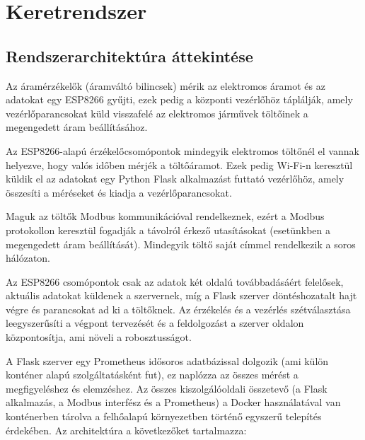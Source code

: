 \chapter{Keretrendszer}

\section{Rendszerarchitektúra áttekintése}

Az áramérzékelők (áramváltó bilincsek) mérik az elektromos áramot és az 
adatokat egy ESP8266 gyűjti, ezek pedig a központi vezérlőhöz táplálják, 
amely vezérlőparancsokat küld visszafelé az elektromos járművek töltőinek 
a megengedett áram beállításához.

Az ESP8266-alapú érzékelőcsomópontok mindegyik elektromos töltőnél el vannak helyezve, 
hogy valós időben mérjék a töltőáramot.
Ezek pedig Wi-Fi-n keresztül küldik el az adatokat egy Python Flask alkalmazást futtató 
vezérlőhöz, amely összesíti a méréseket és kiadja a vezérlőparancsokat.

Maguk az töltők Modbus kommunikációval rendelkeznek, ezért a Modbus protokollon keresztül fogadják a 
távolról érkező utasításokat (esetünkben a megengedett áram beállítását).
Mindegyik töltő saját címmel rendelkezik a soros hálózaton.

Az ESP8266 csomópontok csak az adatok két oldalú továbbadásáért felelősek, aktuális adatokat küldenek a 
szervernek, míg a Flask szerver döntéshozatalt hajt végre és parancsokat ad ki a töltőknek.
Az érzékelés és a vezérlés szétválasztása leegyszerűsíti a végpont tervezését 
és a feldolgozást a szerver oldalon központosítja, ami növeli a robosztusságot.

A Flask szerver egy Prometheus idősoros adatbázissal dolgozik 
(ami külön konténer alapú szolgáltatásként fut), ez naplózza az összes mérést 
a megfigyeléshez és elemzéshez. Az összes kiszolgálóoldali összetevő (a Flask alkalmazás, a Modbus 
interfész és a Prometheus) a Docker használatával van konténerben tárolva a 
felhőalapú környezetben történő egyszerű telepítés érdekében. Az architektúra a 
következőket tartalmazza:

